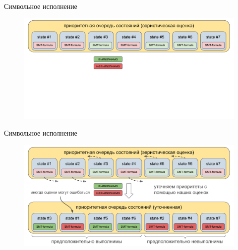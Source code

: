 \documentclass[14pt,aspectratio=169,hyperref={pdftex,unicode},xcolor=dvipsnames]{beamer}
\begin{document}
\begin{frame}{Символьное исполнение}

\begin{figure}[ht]
\begin{center}
  \includegraphics[scale=0.53]{./assets/symbex-ranking-1.pdf}
\end{center}
\end{figure}

\end{frame}



\begin{frame}[noframenumbering]{Символьное исполнение}

\begin{figure}[ht]
\begin{center}
  \includegraphics[scale=0.53]{./assets/symbex-ranking-2.pdf}
\end{center}
\end{figure}

\end{frame}
\end{document}

